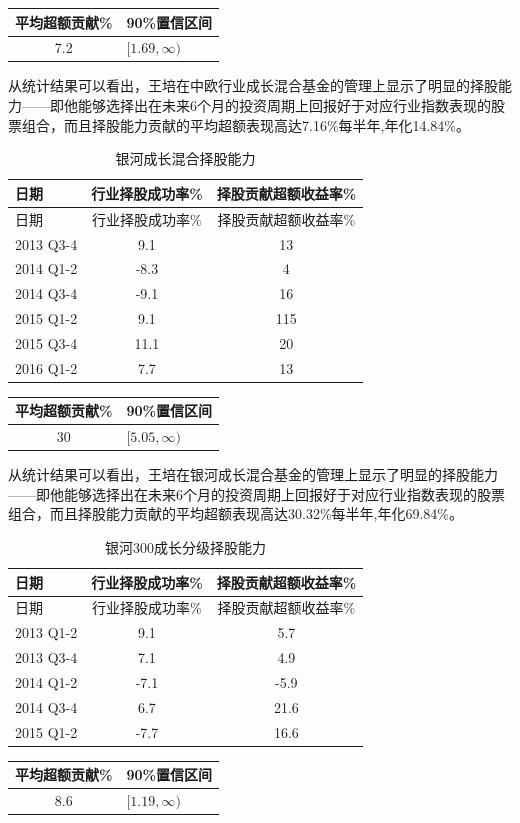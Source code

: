 \documentclass[hyperref,]{ctexart}
\begin{document}
\begin{longtable}[]{@{}cl@{}}
\toprule
平均超额贡献\% & 90\%置信区间\tabularnewline
\midrule
\endhead
7.2 & \([1.69,\infty)\)\tabularnewline
\bottomrule
\end{longtable}

从统计结果可以看出，王培在中欧行业成长混合基金的管理上显示了明显的择股能力------即他能够选择出在未来6个月的投资周期上回报好于对应行业指数表现的股票组合，而且择股能力贡献的平均超额表现高达7.16\%每半年,年化14.84\%。

\begin{longtable}[]{@{}lcc@{}}
\caption{银河成长混合择股能力}\tabularnewline
\toprule
日期 & 行业择股成功率\% & 择股贡献超额收益率\%\tabularnewline
\midrule
\endfirsthead
\toprule
日期 & 行业择股成功率\% & 择股贡献超额收益率\%\tabularnewline
\midrule
\endhead
2013 Q3-4 & 9.1 & 13\tabularnewline
2014 Q1-2 & -8.3 & 4\tabularnewline
2014 Q3-4 & -9.1 & 16\tabularnewline
2015 Q1-2 & 9.1 & 115\tabularnewline
2015 Q3-4 & 11.1 & 20\tabularnewline
2016 Q1-2 & 7.7 & 13\tabularnewline
\bottomrule
\end{longtable}

\begin{longtable}[]{@{}cl@{}}
\toprule
平均超额贡献\% & 90\%置信区间\tabularnewline
\midrule
\endhead
30 & \([5.05,\infty)\)\tabularnewline
\bottomrule
\end{longtable}

从统计结果可以看出，王培在银河成长混合基金的管理上显示了明显的择股能力------即他能够选择出在未来6个月的投资周期上回报好于对应行业指数表现的股票组合，而且择股能力贡献的平均超额表现高达30.32\%每半年,年化69.84\%。

\begin{longtable}[]{@{}lcc@{}}
\caption{银河300成长分级择股能力}\tabularnewline
\toprule
日期 & 行业择股成功率\% & 择股贡献超额收益率\%\tabularnewline
\midrule
\endfirsthead
\toprule
日期 & 行业择股成功率\% & 择股贡献超额收益率\%\tabularnewline
\midrule
\endhead
2013 Q1-2 & 9.1 & 5.7\tabularnewline
2013 Q3-4 & 7.1 & 4.9\tabularnewline
2014 Q1-2 & -7.1 & -5.9\tabularnewline
2014 Q3-4 & 6.7 & 21.6\tabularnewline
2015 Q1-2 & -7.7 & 16.6\tabularnewline
\bottomrule
\end{longtable}

\begin{longtable}[]{@{}cl@{}}
\toprule
平均超额贡献\% & 90\%置信区间\tabularnewline
\midrule
\endhead
8.6 & \([1.19,\infty)\)\tabularnewline
\bottomrule
\end{longtable}
\end{document}
